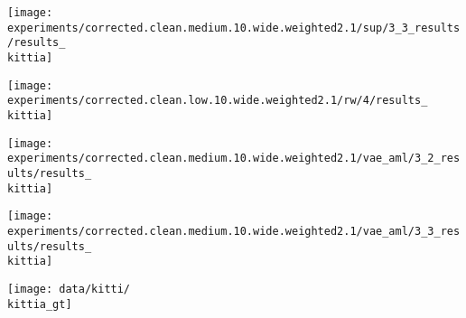 \begin{minipage}[t]{0.1\textwidth}
    \vspace{0px}\centering
    \texttt{[image: experiments/corrected.clean.medium.10.wide.weighted2.1/sup/3\_3\_results/results\_\\kittia]}
\end{minipage}
\begin{minipage}[t]{0.1\textwidth}
    \vspace{0px}\centering
    \texttt{[image: experiments/corrected.clean.low.10.wide.weighted2.1/rw/4/results\_\\kittia]}
\end{minipage}
\begin{minipage}[t]{0.1\textwidth}
    \vspace{0px}\centering
\end{minipage}
\begin{minipage}[t]{0.1\textwidth}
    \vspace{0px}\centering
    \texttt{[image: experiments/corrected.clean.medium.10.wide.weighted2.1/vae\_aml/3\_2\_results/results\_\\kittia]}
\end{minipage}
\begin{minipage}[t]{0.1\textwidth}
    \vspace{0px}\centering
    \texttt{[image: experiments/corrected.clean.medium.10.wide.weighted2.1/vae\_aml/3\_3\_results/results\_\\kittia]}
\end{minipage}
\begin{minipage}[t]{0.1\textwidth}
    \vspace{0px}\centering
    \texttt{[image: data/kitti/\\kittia\_gt]}
\end{minipage}
